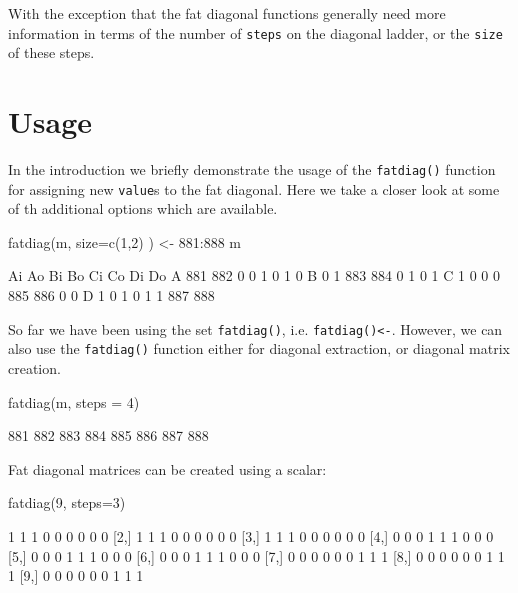 \documentclass[article]{jss}
\begin{document}
With the exception that the fat diagonal functions generally need more
information in terms of the number of \texttt{steps} on the diagonal
ladder, or the \texttt{size} of these steps.

\section{Usage}\label{usage}

In the introduction we briefly demonstrate the usage of the
\texttt{fatdiag()} function for assigning new \texttt{value}s to the fat
diagonal. Here we take a closer look at some of th additional options
which are available.

\begin{CodeChunk}
\begin{CodeInput}
fatdiag(m, size=c(1,2) ) <- 881:888
m
\end{CodeInput}
\begin{CodeOutput}
   Ai  Ao  Bi  Bo  Ci  Co  Di  Do
A 881 882   0   0   1   0   1   0
B   0   1 883 884   0   1   0   1
C   1   0   0   0 885 886   0   0
D   1   0   1   0   1   1 887 888
\end{CodeOutput}
\end{CodeChunk}

So far we have been using the set \texttt{fatdiag()}, i.e.
\texttt{fatdiag()\textless{}-}. However, we can also use the
\texttt{fatdiag()} function either for diagonal extraction, or diagonal
matrix creation.

\begin{CodeChunk}
\begin{CodeInput}
fatdiag(m, steps = 4)
\end{CodeInput}
\begin{CodeOutput}
[1] 881 882 883 884 885 886 887 888
\end{CodeOutput}
\end{CodeChunk}

Fat diagonal matrices can be created using a scalar:

\begin{CodeChunk}
\begin{CodeInput}
fatdiag(9, steps=3)
\end{CodeInput}
\begin{CodeOutput}
      [,1] [,2] [,3] [,4] [,5] [,6] [,7] [,8] [,9]
 [1,]    1    1    1    0    0    0    0    0    0
 [2,]    1    1    1    0    0    0    0    0    0
 [3,]    1    1    1    0    0    0    0    0    0
 [4,]    0    0    0    1    1    1    0    0    0
 [5,]    0    0    0    1    1    1    0    0    0
 [6,]    0    0    0    1    1    1    0    0    0
 [7,]    0    0    0    0    0    0    1    1    1
 [8,]    0    0    0    0    0    0    1    1    1
 [9,]    0    0    0    0    0    0    1    1    1
\end{CodeOutput}
\end{CodeChunk}
\end{document}
